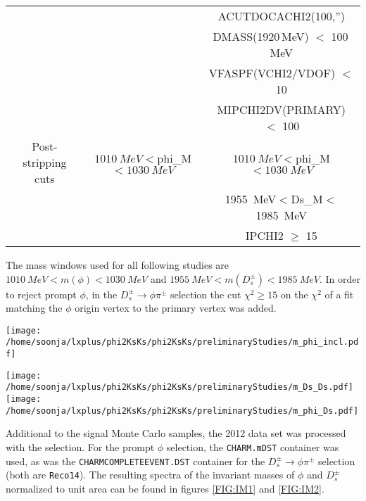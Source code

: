 \begin{center}
{\begin{tabular}{c|cc}
&&ACUTDOCACHI2(100,'')\\
&&DMASS(1920\,MeV) $<$ 100\,MeV\\
&&VFASPF(VCHI2/VDOF) $<$ 10\\
&&MIPCHI2DV(PRIMARY) $<$ 100\\
\hline
Post-stripping cuts & $\SI{1010}{MeV}<$phi\_M$<\SI{1030}{MeV}$ &$\SI{1010}{MeV}<$phi\_M$<\SI{1030}{MeV}$\\
&&\SI{1955}{MeV}$<$Ds\_M$<$\SI{1985}{MeV}\\
&&IPCHI2 $\geq$ 15
\end{tabular} }
\label{TAB:Stripping}
\end{center}
The mass windows used for all following studies are $\SI{1010}{MeV} < m(\phi) < \SI{1030}{MeV}$ and $\SI{1955}{MeV} < m(D_s^\pm) < \SI{1985}{MeV}$. In order to reject prompt $\phi$, in the $D_s^\pm \rightarrow \phi \pi^\pm$ selection the cut $\chi^2 \geq 15$ on the $\chi^2$ of a fit matching the $\phi$ origin vertex to the primary vertex was added. 


\begin{center}
\texttt{[image: /home/soonja/lxplus/phi2KsKs/phi2KsKs/preliminaryStudies/m\_phi\_incl.pdf]}
\label{FIG:IM1}
\end{center}

\begin{center}
\texttt{[image: /home/soonja/lxplus/phi2KsKs/phi2KsKs/preliminaryStudies/m\_Ds\_Ds.pdf]}
\texttt{[image: /home/soonja/lxplus/phi2KsKs/phi2KsKs/preliminaryStudies/m\_phi\_Ds.pdf]}
\label{FIG:IM2}
\end{center}


Additional to the signal Monte Carlo samples, the 2012 data set was processed with the selection. For the prompt $\phi$ selection, the \verb!CHARM.mDST! container was used, as was the \verb!CHARMCOMPLETEEVENT.DST! container for the $D_s^\pm \rightarrow \phi \pi^\pm$ selection (both are \verb!Reco14!). The resulting spectra of the invariant masses of $\phi$ and $D_s^\pm$ normalized to unit area can be found in figures \ref{FIG:IM1} and \ref{FIG:IM2}.


